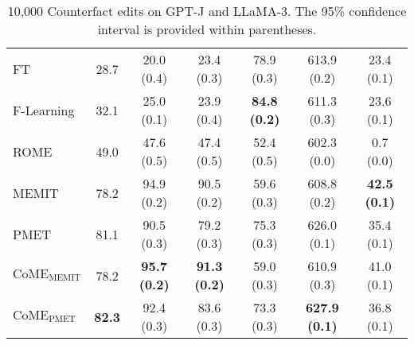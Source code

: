 \begin{table*}[]
{\begin{tabular}{lcccccc}
FT & 28.7 & 20.0 (0.4) & 23.4 (0.3) & 78.9 (0.3) & 613.9 (0.2) & 23.4 (0.1)         \\
F-Learning & 32.1 & 25.0 (0.1) & 23.9 (0.4) & \textbf{84.8 (0.2)} & 611.3 (0.3) & 23.6 (0.1)         \\
ROME             & 49.0          & 47.6 (0.5)          & 47.4 (0.5)          & 52.4 (0.5)         & 602.3 (0.0)          & 0.7 (0.0)           \\
MEMIT            & 78.2          & 94.9 (0.2)          & 90.5 (0.2)          & 59.6 (0.3)          & 608.8 (0.2)          & \textbf{42.5 (0.1)} \\
PMET             & 81.1          & 90.5 (0.3)          & 79.2 (0.3)          & 75.3 (0.3)          & 626.0 (0.1)          & 35.4 (0.1)          \\ \hline
\textbf{$\text{CoME}_{\text{MEMIT}}$}       & 78.2          & \textbf{95.7 (0.2)} & \textbf{91.3 (0.2)} & 59.0 (0.3)          & 610.9 (0.3)          & 41.0 (0.1)          \\
\textbf{$\text{CoME}_{\text{PMET}}$}        & \textbf{82.3} & 92.4 (0.3)          & 83.6 (0.3)          & 73.3 (0.3) & \textbf{627.9 (0.1)} & 36.8 (0.1)    \\ \bottomrule
\end{tabular}
}
\caption{10,000 Counterfact edits on GPT-J and LLaMA-3. The 95\% confidence interval is provided within parentheses.}
\label{tab:main_coun}
\end{table*}

